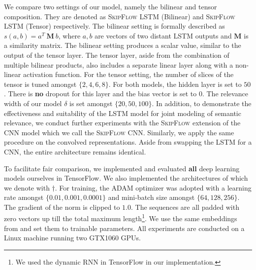 \documentclass[letterpaper]{article}
\begin{document}
We compare two settings of our model, namely the bilinear and tensor composition. They are denoted as \textsc{SkipFlow} LSTM (Bilinear) and \textsc{SkipFlow} LSTM (Tensor) respectively. The bilinear setting is formally described as $s(a,b) = a^{T}\: \textbf{M} \:b$, where $a,b$ are vectors of two distant LSTM outputs and $\textbf{M}$ is a similarity matrix. The bilinear setting produces a scalar value, similar to the output of the tensor layer. The tensor layer, aside from the combination of multiple bilinear products, also includes a separate linear layer along with a non-linear activation function. For the tensor setting, the number of slices of the tensor is tuned amongst $\{2,4,6,8\}$. For both models, the hidden layer is set to $50$. There is \textbf{no} dropout for this layer and the bias vector is set to $0$. The relevance width of our model $\delta$ is set amongst $\{20,50,100\}$. In addition, to demonstrate the effectiveness and suitability of the LSTM model for joint modeling of semantic relevance, we conduct further experiments with the \textsc{SkipFlow} extension of the CNN model which we call the \textsc{SkipFlow} CNN. Similarly, we apply the same procedure on the convolved representations. Aside from swapping the LSTM for a CNN, the entire architecture remains identical. 


To facilitate fair comparison, we implemented and evaluated \textbf{all} deep learning models ourselves in TensorFlow. We also implemented the architectures of \cite{DBLP:conf/emnlp/TaghipourN16} which we denote with $\dagger$. For training, the ADAM optimizer \cite{DBLP:journals/corr/KingmaB14} was adopted with a learning rate amongst $\{0.01,0.001,0.0001\}$ and mini-batch size amongst $\{64,128,256\}$. The gradient of the norm is clipped to $1.0$. The sequences are all padded with zero vectors up till the total maximum length\footnote{We used the dynamic RNN in TensorFlow in our implementation.}. We use the same embeddings from \cite{DBLP:conf/emnlp/TaghipourN16} and set them to trainable parameters. All experiments are conducted on a Linux machine running two GTX1060 GPUs. 
 
\end{document}
